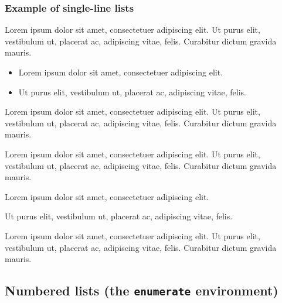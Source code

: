 \documentclass[draft*,nochapters]{aaltoseries}
\begin{document}
\subsubsection{Example of single-line lists}
Lorem ipsum dolor sit amet, consectetuer adipiscing elit. Ut purus elit,  vestibulum ut, placerat ac, adipiscing vitae, felis. Curabitur dictum gravida mauris.
\begin{itemize}
\setlength{\itemsep}{0mm}
\item Lorem ipsum dolor sit amet, consectetuer adipiscing elit.
\item Ut purus elit,  vestibulum ut, placerat ac, adipiscing vitae, felis.
\end{itemize}
Lorem ipsum dolor sit amet, consectetuer adipiscing elit. Ut purus elit,  vestibulum ut, placerat ac, adipiscing vitae, felis. Curabitur dictum gravida mauris.

Lorem ipsum dolor sit amet, consectetuer adipiscing elit. Ut purus elit,  vestibulum ut, placerat ac, adipiscing vitae, felis. Curabitur dictum gravida mauris.
\begin{singleitems}%
\item Lorem ipsum dolor sit amet, consectetuer adipiscing elit.
\item Ut purus elit,  vestibulum ut, placerat ac, adipiscing vitae, felis.
\end{singleitems}
Lorem ipsum dolor sit amet, consectetuer adipiscing elit. Ut purus elit,  vestibulum ut, placerat ac, adipiscing vitae, felis. Curabitur dictum gravida mauris.

\subsection{Numbered lists (the \texttt{enumerate} environment)}
\end{document}
